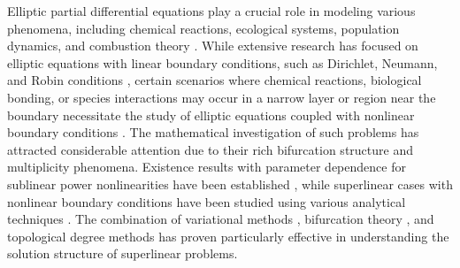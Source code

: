 \documentclass[12pt, reqno]{amsart}
\numberwithin{equation}{section}
\begin{document}
Elliptic partial differential equations play a crucial role in modeling various phenomena, including chemical reactions, ecological systems, population dynamics, and combustion theory \cite{CantrellCosner_2006, LaceyOckendonSabina_1998, Pao_book}. While extensive research has focused on elliptic equations with linear boundary conditions, such as Dirichlet, Neumann, and Robin conditions \cite{Dil_Oth_1999, Gurung-Gokul-Adhikary, Liu-Shi_2018}, certain scenarios where chemical reactions, biological bonding, or species interactions may occur in a narrow layer or region near the boundary necessitate the study of elliptic equations coupled with nonlinear boundary conditions \cite{Amann_1976, CantrellCosner_2006, Gordon-Ko-Shivaji, Inkmann, Liu-Shi_2018, Mavinga-Pardo_PRSE_2017, Amster-DeNapoli, Umezu-2023, BCDMP_2022}.
The mathematical investigation of such problems has attracted considerable attention due to their rich bifurcation structure and multiplicity phenomena. Existence results with parameter dependence for sublinear power nonlinearities have been established \cite{Mavinga-Pardo_PRSE_2017, Umezu-2023}, while superlinear cases with nonlinear boundary conditions have been studied using various analytical techniques \cite{Inkmann, BCDMP_2022}. The combination of variational methods \cite{Amster-DeNapoli}, bifurcation theory \cite{Liu-Shi_2018, Mavinga-Pardo_PRSE_2017}, and topological degree methods \cite{Gordon-Ko-Shivaji} has proven particularly effective in understanding the solution structure of superlinear problems.
\end{document}
